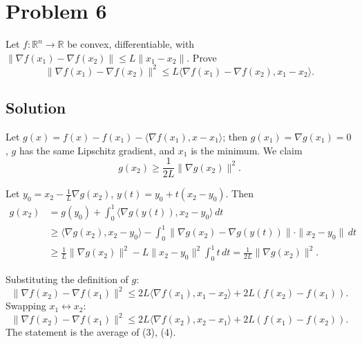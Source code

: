 \documentclass{article}
\begin{document}
\section*{Problem 6}
Let $f:\mathbb{R}^n\to\mathbb{R}$ be convex, differentiable, with $\|\nabla f(x_1)-\nabla f(x_2)\|\le L\|x_1-x_2\|$. Prove
\[\|\nabla f(x_1)-\nabla f(x_2)\|^2 \le L\langle \nabla f(x_1)-\nabla f(x_2), x_1-x_2\rangle.\]

\subsection*{Solution}
Let $g(x)=f(x)-f(x_1)-\langle \nabla f(x_1),x-x_1\rangle$; then $g(x_1)=\nabla g(x_1)=0$, $g$ has the same Lipschitz gradient, and $x_1$ is the minimum. We claim
\[g(x_2)\ge \frac{1}{2L}\|\nabla g(x_2)\|^2. \tag{2}\]

Let $y_0 = x_2 - \frac1L\nabla g(x_2)$, $y(t)=y_0+t(x_2-y_0)$. Then
\begin{align*}
g(x_2) &= g(y_0) + \int_0^1 \langle \nabla g(y(t)), x_2-y_0\rangle\,dt\\
&\ge \langle \nabla g(x_2), x_2-y_0\rangle - \int_0^1 \|\nabla g(x_2)-\nabla g(y(t))\|\cdot\|x_2-y_0\|\,dt\\
&\ge \frac1L\|\nabla g(x_2)\|^2 - L\|x_2-y_0\|^2\int_0^1 t\,dt = \frac{1}{2L}\|\nabla g(x_2)\|^2.
\end{align*}

Substituting the definition of $g$:
\[\|\nabla f(x_2)-\nabla f(x_1)\|^2 \le 2L\langle \nabla f(x_1), x_1-x_2\rangle + 2L(f(x_2)-f(x_1)). \tag{3}\]
Swapping $x_1\leftrightarrow x_2$:
\[\|\nabla f(x_2)-\nabla f(x_1)\|^2 \le 2L\langle \nabla f(x_2), x_2-x_1\rangle + 2L(f(x_1)-f(x_2)). \tag{4}\]
The statement is the average of (3), (4).
\end{document}
